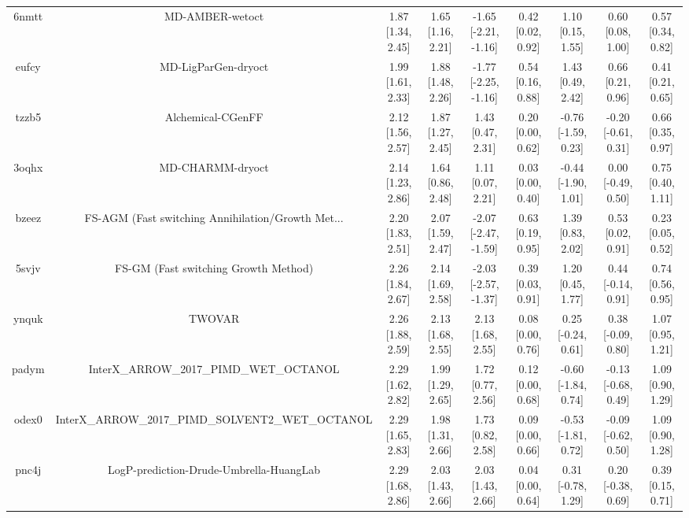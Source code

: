 \documentclass{article}
\begin{document}
\begin{center}
\begin{longtable}{|ccccccccc|}
 6nmtt &                                    MD-AMBER-wetoct &  1.87 [1.34, 2.45] &  1.65 [1.16, 2.21] &  -1.65 [-2.21, -1.16] &  0.42 [0.02, 0.92] &    1.10 [0.15, 1.55] &    0.60 [0.08, 1.00] &     0.57 [0.34, 0.82] \\
 eufcy &                                MD-LigParGen-dryoct &  1.99 [1.61, 2.33] &  1.88 [1.48, 2.26] &  -1.77 [-2.25, -1.16] &  0.54 [0.16, 0.88] &    1.43 [0.49, 2.42] &    0.66 [0.21, 0.96] &     0.41 [0.21, 0.65] \\
 tzzb5 &                                  Alchemical-CGenFF &  2.12 [1.56, 2.57] &  1.87 [1.27, 2.45] &     1.43 [0.47, 2.31] &  0.20 [0.00, 0.62] &  -0.76 [-1.59, 0.23] &  -0.20 [-0.61, 0.31] &     0.66 [0.35, 0.97] \\
 3oqhx &                                   MD-CHARMM-dryoct &  2.14 [1.23, 2.86] &  1.64 [0.86, 2.48] &     1.11 [0.07, 2.21] &  0.03 [0.00, 0.40] &  -0.44 [-1.90, 1.01] &   0.00 [-0.49, 0.50] &     0.75 [0.40, 1.11] \\
 bzeez &  FS-AGM (Fast switching Annihilation/Growth Met... &  2.20 [1.83, 2.51] &  2.07 [1.59, 2.47] &  -2.07 [-2.47, -1.59] &  0.63 [0.19, 0.95] &    1.39 [0.83, 2.02] &    0.53 [0.02, 0.91] &     0.23 [0.05, 0.52] \\
 5svjv &               FS-GM (Fast switching Growth Method) &  2.26 [1.84, 2.67] &  2.14 [1.69, 2.58] &  -2.03 [-2.57, -1.37] &  0.39 [0.03, 0.91] &    1.20 [0.45, 1.77] &   0.44 [-0.14, 0.91] &     0.74 [0.56, 0.95] \\
 ynquk &                                             TWOVAR &  2.26 [1.88, 2.59] &  2.13 [1.68, 2.55] &     2.13 [1.68, 2.55] &  0.08 [0.00, 0.76] &   0.25 [-0.24, 0.61] &   0.38 [-0.09, 0.80] &     1.07 [0.95, 1.21] \\
 padym &            InterX\_ARROW\_2017\_PIMD\_WET\_OCTANOL &  2.29 [1.62, 2.82] &  1.99 [1.29, 2.65] &     1.72 [0.77, 2.56] &  0.12 [0.00, 0.68] &  -0.60 [-1.84, 0.74] &  -0.13 [-0.68, 0.49] &     1.09 [0.90, 1.29] \\
 odex0 &  InterX\_ARROW\_2017\_PIMD\_SOLVENT2\_WET\_OCTANOL &  2.29 [1.65, 2.83] &  1.98 [1.31, 2.66] &     1.73 [0.82, 2.58] &  0.09 [0.00, 0.66] &  -0.53 [-1.81, 0.72] &  -0.09 [-0.62, 0.50] &     1.09 [0.90, 1.28] \\
 pnc4j &            LogP-prediction-Drude-Umbrella-HuangLab &  2.29 [1.68, 2.86] &  2.03 [1.43, 2.66] &     2.03 [1.43, 2.66] &  0.04 [0.00, 0.64] &   0.31 [-0.78, 1.29] &   0.20 [-0.38, 0.69] &     0.39 [0.15, 0.71] \\

\end{longtable}
\end{center}
\end{document}
